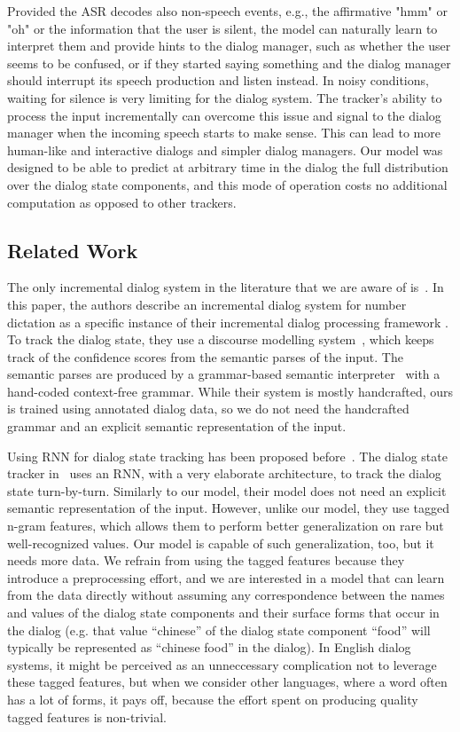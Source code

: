 \documentclass[10pt,twocolumn]{article}
\begin{document}
Provided the ASR decodes also non-speech events, e.g., the affirmative "hmm" or "oh" or the information that the user is silent, the model can naturally learn to interpret them and provide hints to the dialog manager, such as whether the user seems to be confused, or if they started saying something and the dialog manager should interrupt its speech production and listen instead. In noisy conditions, waiting for silence is very limiting for the dialog system. The tracker's ability to process the input incrementally can overcome this issue and signal to the dialog manager when the incoming speech starts to make sense. This can lead to more human-like and interactive dialogs and simpler dialog managers. Our model was designed to be able to predict at arbitrary time in the dialog the full distribution over the dialog state components, and this mode of operation costs no additional computation as opposed to other trackers.

\subsection{Related Work}
\label{sec:related}

The only incremental dialog system in the literature that we are aware of is~\cite{skantze2009incremental}. In this paper, the authors describe an incremental dialog system for number dictation as a specific instance of their incremental dialog processing framework \cite{schlangen2009general}. To track the dialog state, they use a discourse modelling system~\cite{skantze2008galatea}, which keeps track of the confidence scores from the semantic parses of the input. The semantic parses are produced by a grammar-based semantic interpreter~\cite{skantze2004robust} with a hand-coded context-free grammar. While their system is mostly handcrafted, ours is trained using annotated dialog data, so we do not need the handcrafted grammar and an explicit semantic representation of the input.

Using RNN for dialog state tracking has been proposed before~\cite{henderson2014word,henderson2013deep}. The dialog state tracker in~\cite{henderson2014word} uses an RNN, with a very elaborate architecture, to track the dialog state turn-by-turn. Similarly to our model, their model does not need an explicit semantic representation of the input. However, unlike our model, they use tagged n-gram features, which allows them to perform better generalization on rare but well-recognized values. Our model is capable of such generalization, too, but it needs more data. We refrain from using the tagged features because they introduce a preprocessing effort, and we are interested in a model that can learn from the data directly without assuming any correspondence between the names and values of the dialog state components and their surface forms that occur in the dialog (e.g. that value ``chinese'' of the dialog state component ``food'' will typically be represented as ``chinese food'' in the dialog). In English dialog systems, it might be perceived as an unneccessary complication not to leverage these tagged features, but when we consider other languages, where a word often has a lot of forms, it pays off, because the effort spent on producing quality tagged features is non-trivial.
\end{document}
